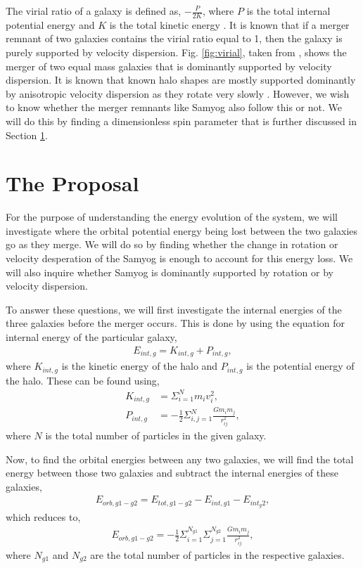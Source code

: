 \documentclass[twocolumn]{aastex631}
\begin{document}
The virial ratio of a galaxy is defined as, $-\frac{P}{2K}$,
where $P$ is the total internal potential energy and $K$ is the total kinetic energy \citep{same_mass_merger_1}. It is known that if a merger remnant of two galaxies contains the virial ratio equal to 1, then the galaxy is purely supported by velocity dispersion. Fig. \ref{fig:virial}, taken from \cite{same_mass_merger_1}, shows the merger of two equal mass galaxies that is dominantly supported by velocity dispersion. It is known that known halo shapes are mostly supported dominantly by anisotropic velocity dispersion as they rotate very slowly \citep{spin_param_explain}. However, we wish to know whether the merger remnants like Samyog also follow this or not. We will do this by finding a dimensionless spin parameter that is further discussed in Section \ref{sec:prop}. 

\section{The Proposal}
\label{sec:prop}
For the purpose of understanding the energy evolution of the system, we will investigate where the orbital potential energy being lost between the two galaxies go as they merge. We will do so by finding whether the change in rotation or velocity desperation of the Samyog is enough to account for this energy loss. We will also inquire whether Samyog is dominantly supported by rotation or by velocity dispersion. 

To answer these questions, we will first investigate the internal energies of the three galaxies before the merger occurs. This is done by using the equation for internal energy of the particular galaxy,
\begin{align}
    E_{int,g} = K_{int,g} + P_{int,g},
    \label{eq:internal_energy}
\end{align}
where $K_{int,g}$ is the kinetic energy of the halo and $P_{int,g}$ is the potential energy of the halo. These can be found using,
\begin{align}
    K_{int,g} &= \Sigma_{i=1}^N m_i v_i^2, \nonumber \\ 
    P_{int,g} &= -\frac{1}{2} \Sigma_{i,j=1}^{N} \frac{G m_i m_j}{r_{ij}^2},
    \label{eq:kinetic_and_potential_energy}
\end{align}
where $N$ is the total number of particles in the given galaxy. 

Now, to find the orbital energies between any two galaxies, we will find the total energy between those two galaxies and subtract the internal energies of these galaxies,
\begin{align}
    E_{orb,g1-g2} = E_{tot,g1-g2} - E_{int,g1} - E_{int_g2}, \nonumber
\end{align}
which reduces to,
\begin{align}
    E_{orb,g1-g2} = -\frac{1}{2} \Sigma_{i=1}^{N_{g1}} \Sigma_{j=1}^{N_{g2}} \frac{G m_i m_j}{r_{ij}^2},
    \label{eq:orbital_energy}
\end{align}
where $N_{g1}$ and $N_{g2}$ are the total number of particles in the respective galaxies.
\end{document}

